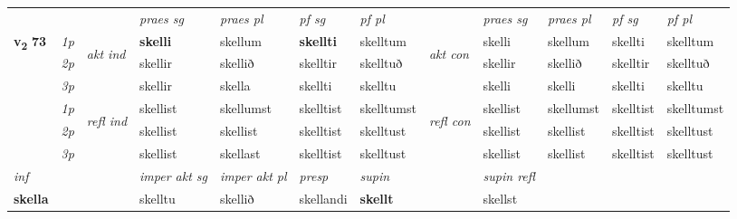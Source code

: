 \begin{longtable}[l]{X>{\footnotesize\itshape}llXXXXlXXXX}
 & &   & \textit{praes sg}  & \textit{praes pl}    & \textit{ pf sg} & \textit{pf pl} & & \textit{praes sg}  & \textit{praes pl}    & \textit{pf sg} & \textit{pf pl }  \\ \cmidrule{4-7} \cmidrule{9-12}
 \multirow{2}{*}{{{\textbf{v{\textsubscript{2}}} \Large{\textbf{73}}}}}  & 1p & \multirow{3}{*}{\begin{turn}{90}\textit{akt ind}\end{turn}} & \textbf{skelli} & skellum & \textbf{skellti} & skelltum & \multirow{3}{*}{\begin{turn}{90}\textit{akt con}\end{turn}} &skelli & skellum & skellti & skelltum\\*
 & 2p &  &  skellir  & skellið & skelltir & skelltuð & & skellir & skellið & skelltir & skelltuð \\*
 & 3p &  & skellir & skella & skellti & skelltu & & skelli & skelli& skellti & skelltu \\*
\cmidrule{4-7} \cmidrule{9-12}
 & 1p & \multirow{3}{*}{\begin{turn}{90}\textit{refl ind}\end{turn}}  & skellist & skellumst & skelltist & skelltumst & \multirow{3}{*}{\begin{turn}{90}\textit{refl con}\end{turn}}  &skellist & skellumst & skelltist & skelltumst \\*
 & 2p &  & skellist & skellist & skelltist & skelltust & &skellist & skellist & skelltist & skelltust \\*
 & 3p  & & skellist & skellast & skelltist & skelltust & & skellist & skellist& skelltist & skelltust \\*
\cmidrule{4-7} \cmidrule{9-12}

   {\textit{inf}} & &  & \textit{imper akt sg} & \textit{imper akt pl}   & \textit{presp} & \textit{supin} && \textit{supin refl}  \\*
  {\textbf{skella}} & && skelltu  & skellið   & skellandi &  \textbf{skellt} && skellst  \\*

\midrule


\end{longtable}
